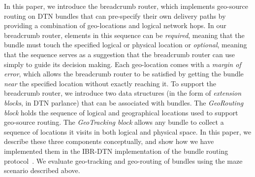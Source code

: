 In this paper, we introduce the {\sc breadcrumb} router, which implements geo-source routing on DTN bundles that can pre-specify their own delivery paths by providing a combination of geo-locations and logical network hops. In our {\sc breadcrumb} router, elements in this sequence can be {\em required}, meaning that the bundle must touch the specified logical or physical location or {\em optional}, meaning that the sequence serves as a suggestion that the {\sc breadcrumb} router can use simply to guide its decision making. Each geo-location comes with a {\em margin of error}, which allows the {\sc breadcrumb} router to be satisfied by getting the bundle {\em near} the specified location without exactly reaching it. To support the {\sc breadcrumb} router, we introduce two data structures (in the form of {\em extension blocks}, in DTN parlance) that can be associated with bundles. The {\em GeoRouting block} holds the sequence of logical and geographical locations used to support geo-source routing. The {\em GeoTracking block} allows any bundle to collect a sequence of locations it visits in both logical and physical space. In this paper, we describe these three components conceptually, and show how we have implemented them in the IBR-DTN implementation of the bundle routing protocol~\cite{IBR-DTN-WASA}. We evaluate geo-tracking and geo-routing of bundles using the maze scenario described above.






